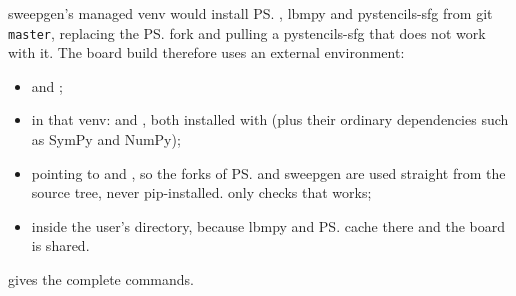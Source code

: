 sweepgen's managed venv would install \ps{}, lbmpy and pystencils-sfg from git
\texttt{master}, replacing the \ps{} fork and pulling a pystencils-sfg that does not
work with it. The board build therefore uses an external environment:
\begin{itemize}
  \item {} and
        ;
  \item in that venv:  and , both
        installed with  (plus their ordinary dependencies
        such as SymPy and NumPy);
  \item {} pointing to  and
        , so the forks of \ps{} and sweepgen
        are used straight from the source tree, never pip-installed.  only checks that 
        works;
  \item {} inside the user's directory, because lbmpy and \ps{}
        cache there and the board is shared.
\end{itemize}
 gives the complete commands.
